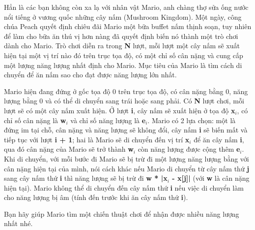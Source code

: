 Hẳn là các bạn không còn xa lạ với nhân vật Mario, anh chàng thợ sửa ống nước nổi tiếng ở vương quốc những cây nấm (Mushroom Kingdom). Một ngày, công chúa Peach quyết định chiêu đãi Mario một bữa buffet nấm thịnh soạn, tuy nhiên để làm cho bữa ăn thú vị hơn nàng đã quyết định biến nó thành một trò chơi dành cho Mario. Trò chơi diễn ra trong \textbf{N} lượt, mỗi lượt một cây nấm sẽ xuất hiện tại một vị trí nào đó trên trục tọa độ, có một chỉ số cân nặng và cung cấp một lượng năng lượng nhất định cho Mario. Mục tiêu của Mario là tìm cách di chuyển để ăn nấm sao cho đạt được năng lượng lớn nhất.

Mario hiện đang đứng ở gốc tọa độ 0 trên trục tọa độ, có cân nặng bằng 0, năng lượng bằng 0 và có thể di chuyển sang trái hoặc sang phải. Có \textbf{N} lượt chơi, mỗi lượt sẽ có một cây nấm xuất hiện. Ở lượt \textbf{i}, cây nấm sẽ xuất hiện ở tọa độ \textbf{x$_i$}, có chỉ số cân nặng là \textbf{w$_i$} và chỉ số năng lượng là \textbf{e$_i$}. Mario có 2 lựa chọn: một là đứng im tại chỗ, cân nặng và năng lượng sẽ không đổi, cây nấm \textbf{i} sẽ biến mất và tiếp tục với lượt \textbf{i + 1}; hai là Mario sẽ di chuyển đến vị trí \textbf{x$_i$} để ăn cây nấm \textbf{i}, qua đó cân nặng của Mario sẽ trở thành \textbf{w$_i$} còn năng lượng được cộng thêm \textbf{e$_i$}. Khi di chuyển, với mỗi bước đi Mario sẽ bị trừ đi một lượng năng lượng bằng với cân nặng hiện tại của mình, nói cách khác nếu Mario di chuyển từ cây nấm thứ \textbf{j} sang cây nấm thứ \textbf{i} thì năng lượng sẽ bị trừ đi \textbf{w * |x$_i$ - x[j]|} (với \textbf{w} là cân nặng hiện tại). Mario không thể di chuyển đến cây nấm thứ \textbf{i} nếu việc di chuyển làm cho năng lượng bị âm (tính đến trước khi ăn cây nấm thứ \textbf{i}).

Bạn hãy giúp Mario tìm một chiến thuật chơi để nhận được nhiều năng lượng nhất nhé.